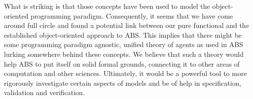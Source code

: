 %
%

What is striking is that those concepts have been used to model the object-oriented programming paradigm. Consequently, it seems that we have come around full circle and found a potential link between our pure functional and the established object-oriented approach to ABS. This implies that there might be some programming paradigm agnostic, unified theory of agents as used in ABS lurking somewhere behind these concepts. We believe that such a theory would help ABS to put itself on solid formal grounds, connecting it to other areas of computation and other sciences. Ultimately, it would be a powerful tool to more rigorously investigate certain aspects of models and be of help in specification, validation and verification.